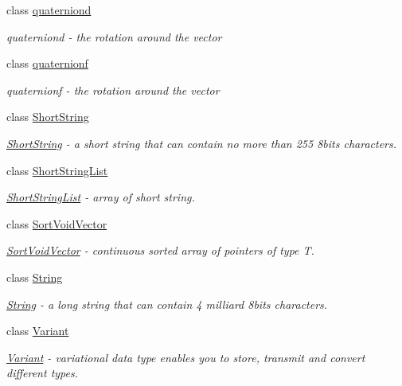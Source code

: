 \begin{DoxyCompactItemize}
class \hyperlink{classbt_1_1quaterniond}{quaterniond}
\begin{DoxyCompactList}\small\item\em quaterniond -\/ the rotation around the vector \end{DoxyCompactList}\item 
class \hyperlink{classbt_1_1quaternionf}{quaternionf}
\begin{DoxyCompactList}\small\item\em quaternionf -\/ the rotation around the vector \end{DoxyCompactList}\item 
class \hyperlink{classbt_1_1_short_string}{Short\-String}
\begin{DoxyCompactList}\small\item\em \hyperlink{classbt_1_1_short_string}{Short\-String} -\/ a short string that can contain no more than 255 8bits characters. \end{DoxyCompactList}\item 
class \hyperlink{classbt_1_1_short_string_list}{Short\-String\-List}
\begin{DoxyCompactList}\small\item\em \hyperlink{classbt_1_1_short_string_list}{Short\-String\-List} -\/ array of short string. \end{DoxyCompactList}\item 
class \hyperlink{classbt_1_1_sort_void_vector}{Sort\-Void\-Vector}
\begin{DoxyCompactList}\small\item\em \hyperlink{classbt_1_1_sort_void_vector}{Sort\-Void\-Vector} -\/ continuous sorted array of pointers of type T. \end{DoxyCompactList}\item 
class \hyperlink{classbt_1_1_string}{String}
\begin{DoxyCompactList}\small\item\em \hyperlink{classbt_1_1_string}{String} -\/ a long string that can contain 4 milliard 8bits characters. \end{DoxyCompactList}\item 
class \hyperlink{classbt_1_1_variant}{Variant}
\begin{DoxyCompactList}\small\item\em \hyperlink{classbt_1_1_variant}{Variant} -\/ variational data type enables you to store, transmit and convert different types. \end{DoxyCompactList}\item 

\end{DoxyCompactItemize}

